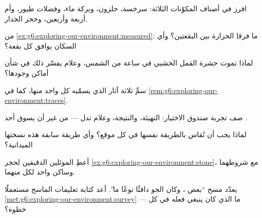 \begin{exercise}[$\star$]\label{exo:g6:exploring-our-environment:3}
افرز في أصناف المكوّنات الثلاثة: سرخسة،  حلزون، وبركة ماء،
وفضلات طيور، وأم أربعة وأربعين، وحجر الجدار.
\end{exercise}

\begin{exercise}[$\star$]\label{exo:g6:exploring-our-environment:4}
من \cref{ex:g6:exploring-our-environment:measured}: ما فرقا الحرارة
 بين البقعتين؟ وأي السكان يوافق كل بقعة؟
\end{exercise}

\begin{exercise}[$\star$]\label{exo:g6:exploring-our-environment:5}
لماذا تموت حشرة القمل الخشبي في ساعة من الشمس، وعلام يفسّر ذلك في
شأن أماكن وجودها؟
\end{exercise}

\begin{exercise}[$\star$]\label{exo:g6:exploring-our-environment:6}
سمِّ ثلاثة آثار  الذي يسمّيه كل واحد منها، كما في
\cref{rem:g6:exploring-our-environment:traces}.
\end{exercise}

\begin{exercise}[$\star\star$]\label{exo:g6:exploring-our-environment:7}
صف تجربة صندوق الاختيار: التهيئة، والنتيجة، وعلام تدل --- من غير
أن يسوق أحد .
\end{exercise}

\begin{exercise}[$\star\star$]\label{exo:g6:exploring-our-environment:8}
لماذا يجب أن تُقاس  بالطريقة نفسها في كل موقع؟ وأي طريقة
سابقة هذه نسختها الميدانية؟
\end{exercise}

\begin{exercise}[$\star\star$]\label{exo:g6:exploring-our-environment:9}
أعطِ الموئلين الدقيقين لحجر \cref{ex:g6:exploring-our-environment:stone}،
مع شروطهما وساكن واحد لكل منهما.
\end{exercise}

\begin{exercise}[$\star\star$]\label{exo:g6:exploring-our-environment:10}
يعدّد مسح ``بعض ، وكان الجو دافئًا نوعًا ما''. أعد كتابة
تعليمات الماسح مستعملًا
\cref{met:g6:exploring-our-environment:survey} --- ما الذي كان
ينبغي فعله في كل خطوة؟
\end{exercise}

